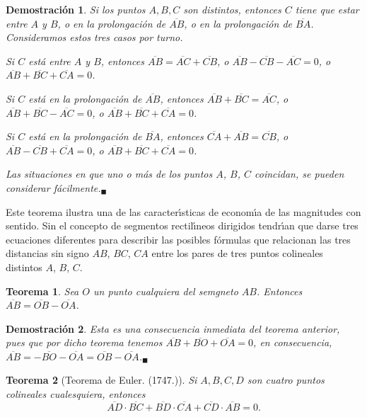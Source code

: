 \documentclass[a4paper,11pt]{article}
\theoremstyle{teoremas}
\newtheorem{teorema}{Teorema}[section]
\theoremstyle{ejemplos}
\theoremstyle{definiciones}
\theoremstyle{lemas}
\newtheorem*{demostracion}{Demostraci\'on}
\begin{document}
\begin{demostracion}
 Si los puntos $A, B, C$ son distintos, entonces $C$ tiene que estar entre $A$ y $B$, o en la prolongaci\'on de $\overline{AB}$, o en la prolongaci\'on de $\overline{BA}$. Consideramos estos tres casos por turno.
 \par 
 Si $C$ est\'a entre $A$ y $B$, entonces $\overline{AB} = \overline{AC} + \overline{CB}$, o $\overline{AB} - \overline{CB} - \overline{AC} = 0$, o $\overline{AB} + \overline{BC} + \overline{CA} = 0$.
 \par 
 Si $C$ est\'a en la prolongaci\'on de $\overline{AB}$, entonces $\overline{AB} + \overline{BC} = \overline{AC}$, o $\overline{AB} + \overline{BC} - \overline{AC} = 0$, o $\overline{AB} + \overline{BC} + \overline{CA} = 0$.
 \par 
 Si $C$ est\'a en la prolongaci\'on de $\overline{BA}$, entonces $\overline{CA} + \overline{AB} = \overline{CB}$, o $\overline{AB} - \overline{CB} + \overline{CA} = 0$, o $\overline{AB} + \overline{BC} + \overline{CA} = 0$.
 \par 
 Las situaciones en que uno o m\'as de los puntos $A$, $B$, $C$ coincidan, se pueden considerar f\'acilmente.${}_{\blacksquare}$
\end{demostracion}

Este teorema ilustra una de las caracter\'{\i}sticas de econom\'{\i}a de las magnitudes con sentido. Sin el concepto de segmentos rectil\'{\i}neos dirigidos tendr\'{\i}an que darse tres ecuaciones diferentes para describir las posibles f\'ormulas que relacionan las tres distancias sin signo $AB$, $BC$, $CA$ entre los pares de tres puntos colineales distintos $A$, $B$, $C$.

\begin{teorema}
 Sea $O$ un punto cualquiera del semgneto $AB$. Entonces $\overline{AB} = \overline{OB} - \overline{OA}$.
\end{teorema}

\begin{demostracion}
 Esta es una consecuencia inmediata del teorema anterior, pues que por dicho teorema tenemos $\overline{AB} + \overline{BO} + \overline{OA} = 0$, en consecuencia, $\overline{AB} = -\overline{BO} - \overline{OA} = \overline{OB} - \overline{OA}$.${}_{\blacksquare}$
\end{demostracion}

\begin{teorema}[Teorema de Euler. (1747.)]
 Si $A,B,C,D$ son cuatro puntos colineales cualesquiera, entonces
 \begin{equation*}
  \overline{AD}\cdot \overline{BC} + \overline{BD}\cdot \overline{CA} + \overline{CD}\cdot \overline{AB} = 0.
 \end{equation*}
\end{teorema}
\end{document}
